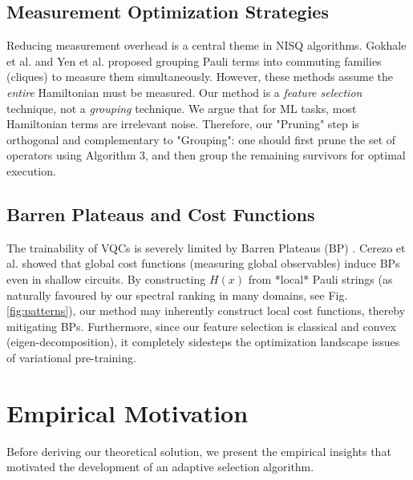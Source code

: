 \documentclass[conference]{IEEEtran}
\begin{document}
\subsection{Measurement Optimization Strategies}
Reducing measurement overhead is a central theme in NISQ algorithms. Gokhale et al. \cite{gokhale2019minimizing} and Yen et al. \cite{yen2020measuring} proposed grouping Pauli terms into commuting families (cliques) to measure them simultaneously. However, these methods assume the \textit{entire} Hamiltonian must be measured. Our method is a \textit{feature selection} technique, not a \textit{grouping} technique. We argue that for ML tasks, most Hamiltonian terms are irrelevant noise. Therefore, our "Pruning" step is orthogonal and complementary to "Grouping": one should first prune the set of operators using Algorithm 3, and then group the remaining survivors for optimal execution.

\subsection{Barren Plateaus and Cost Functions}
The trainability of VQCs is severely limited by Barren Plateaus (BP) \cite{mcclean2018barren}. Cerezo et al. \cite{cerezo2020cost} showed that global cost functions (measuring global observables) induce BPs even in shallow circuits. By constructing $H(x)$ from *local* Pauli strings (as naturally favoured by our spectral ranking in many domains, see Fig. \ref{fig:patterns}), our method may inherently construct local cost functions, thereby mitigating BPs. Furthermore, since our feature selection is classical and convex (eigen-decomposition), it completely sidesteps the optimization landscape issues of variational pre-training.

\section{Empirical Motivation}
\label{sec:motivation}
Before deriving our theoretical solution, we present the empirical insights that motivated the development of an adaptive selection algorithm.
\end{document}
